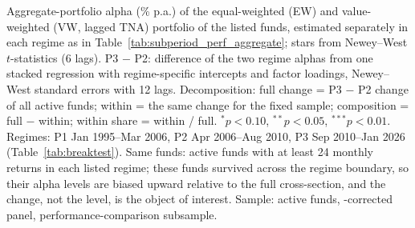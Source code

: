 \begin{table}[!htbp]
\begin{minipage}{\tabletempwidth}
\captionsetup{width=\linewidth}
\caption{Regime Change or Composition? Aggregate Alpha of the Same Funds Across Regimes}\label{tab:same_sample_alpha}
\ifdim\wd\tabletempbox>\linewidth
  \resizebox{\linewidth}{!}{\usebox{\tabletempbox}}
\else
  \usebox{\tabletempbox}
\fi
\par\medskip
\begin{singlespace}\tablefont\noindent
Aggregate-portfolio \textcite{Carhart1997} alpha (\% p.a.) of the equal-weighted (EW) and value-weighted (VW, lagged TNA) portfolio of the listed funds, estimated separately in each regime as in Table~\ref{tab:subperiod_perf_aggregate}; stars from Newey--West $t$-statistics (6 lags). P3 $-$ P2: difference of the two regime alphas from one stacked regression with regime-specific intercepts and factor loadings, Newey--West standard errors with 12 lags. Decomposition: full change = P3 $-$ P2 change of all active funds; within = the same change for the fixed sample; composition = full $-$ within; within share = within / full. $^{*}p<0.10$, $^{**}p<0.05$, $^{***}p<0.01$. Regimes: P1 Jan 1995--Mar 2006, P2 Apr 2006--Aug 2010, P3 Sep 2010--Jan 2026 (Table~\ref{tab:breaktest}). Same funds: active funds with at least 24 monthly returns in each listed regime; these funds survived across the regime boundary, so their alpha levels are biased upward relative to the full cross-section, and the change, not the level, is the object of interest. Sample: active funds, \textcite{Evans2010}-corrected panel, performance-comparison subsample.
\end{singlespace}
\end{minipage}
\end{table}

